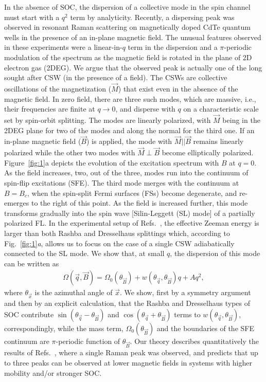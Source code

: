 \documentclass[prb,aps,twocolumn]{revtex4}
\newcommand{\bea}{\begin{eqnarray}}
\newcommand{\eea}{\end{eqnarray}}
\newcommand{\bq}{{\vec q}}
\newcommand{\bB}{{\vec B}}
\begin{document}
{In the absence of SOC, the dispersion of a collective mode in the
spin channel must start with a $q^2$ term by analyticity.}
Recently, a dispersing peak was observed in resonant Raman
scattering on magnetically doped CdTe quantum wells in the
presence of an in-plane magnetic field.\cite{BBX1,BBX2,BBX3} The
unusual features observed in these experiments  were a
linear-in-$q$ term in the dispersion and a $\pi$-periodic
modulation of the spectrum as the magnetic field is rotated in the
plane of 2D electron gas (2DEG). {We argue that} the observed peak
{is actually} one of the long sought after CSW
(in the presence of a field). The CSWs are collective oscillations
of the magnetization ($\vec M$) that exist even in the absence of
the magnetic field. In zero field, there are three such modes,
\cite{Shekhter,Zhang,Ali1,SM1} which are massive, i.e.,  their
frequencies are finite at $q\to 0$, and disperse with $q$ on a
characteristic scale set by spin-orbit splitting. The modes are
linearly polarized, with $\vec M$ being in the 2DEG plane for two
of the modes and along the normal for the third one. If an
in-plane magnetic field ($\bB$) is applied, the mode with $\vec M
|| \vec B$ remains linearly polarized while the other two modes
with $\vec M\perp\vec B$ become elliptically
polarized.\cite{SM_ESR} Figure~\ref{fig:1}a depicts the evolution
of the excitation spectrum with $B$ at $q=0$.   As the field
increases, two, out of the three, modes run into the continuum of
spin-flip excitations (SFE). The third mode merges with the
continuum at $B=B_c$, when the spin-split Fermi surfaces (FSs)
become degenerate, and re-emerges to the right of this point. As
the field is increased further, this mode transforms  gradually
into the spin wave [Silin-Leggett (SL) mode] of a partially
polarized FL.\cite{silin:1958,leggett:1970,statphysII} In the
{experimental setup of Refs}.~, the
effective Zeeman energy is larger than both Rashba and Dresselhaus
splittings which, according to Fig.~\ref{fig:1}{\em a}, allows us
to focus on the case of a single CSW adiabatically connected to
the SL mode. We show that, at small $q$, the dispersion of this
mode can be written as \bea \Omega(\bq,\bB)=
\Omega_0(\theta_\bB)+w(\theta_\bq,\theta_\bB)q+Aq^2, \label{res1}
\eea where $\theta_{\vec x}$ is the azimuthal angle of $\vec x$.
{We show, first by a symmetry argument and then by an explicit
calculation}, that {the} Rashba and Dresselhaus {types of} SOC
contribute $\sin(\theta_\bq-\theta_\bB)$ and
$\cos(\theta_\bq+\theta_\bB)$ terms to $w(\theta_\bq,\theta_\bB)$,
correspondingly, while the mass term, $\Omega_0(\theta_\bB)$ and
the boundaries of the SFE continuum are $\pi$-periodic function of
$\theta_\bB$. Our theory describes quantitatively the results of
Refs.~, where a single Raman peak
was observed,
and predicts
that up to three peaks  can be observed at lower
magnetic fields in systems with higher mobility and/or stronger SOC.
\end{document}

